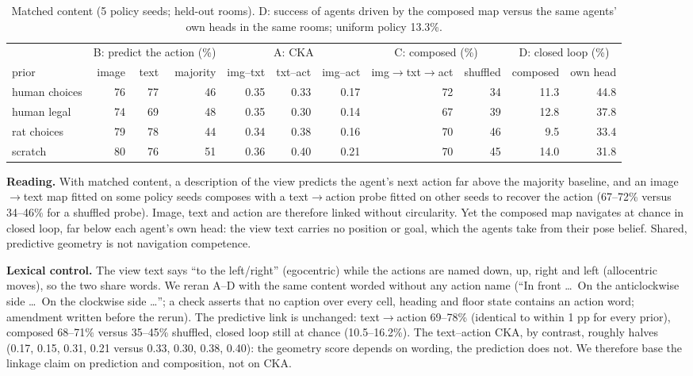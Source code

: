 \documentclass[10pt,onecolumn,letterpaper]{article}
\begin{document}
\begin{table}[h]\centering\footnotesize\setlength{\tabcolsep}{3pt}
\begin{tabular}{@{}lrrrrrrrrrr@{}}\toprule
 & \multicolumn{3}{c}{B: predict the action (\%)} & \multicolumn{3}{c}{A: CKA} & \multicolumn{2}{c}{C: composed (\%)} & \multicolumn{2}{c}{D: closed loop (\%)}\\
prior & image & text & majority & img--txt & txt--act & img--act & img$\to$txt$\to$act & shuffled & composed & own head\\\midrule
human choices & 76 & 77 & 46 & 0.35 & 0.33 & 0.17 & 72 & 34 & 11.3 & 44.8\\
human legal & 74 & 69 & 48 & 0.35 & 0.30 & 0.14 & 67 & 39 & 12.8 & 37.8\\
rat choices & 79 & 78 & 44 & 0.34 & 0.38 & 0.16 & 70 & 46 & 9.5 & 33.4\\
scratch & 80 & 76 & 51 & 0.36 & 0.40 & 0.21 & 70 & 45 & 14.0 & 31.8\\
\bottomrule\end{tabular}
\caption{Matched content (5 policy seeds; held-out rooms). D: success of agents driven by the composed map versus the
same agents' own heads in the same rooms; uniform policy 13.3\%.}\end{table}

\textbf{Reading.} With matched content, a description of the view predicts the agent's next action far above the
majority baseline, and an image$\to$text map fitted on some policy seeds composes with a text$\to$action probe fitted on
other seeds to recover the action (67--72\% versus 34--46\% for a shuffled probe). Image, text and action are therefore
linked without circularity. Yet the composed map navigates at chance in closed loop, far below each agent's own head:
the view text carries no position or goal, which the agents take from their pose belief. Shared, predictive geometry is
not navigation competence.

\textbf{Lexical control.} The view text says ``to the left/right'' (egocentric) while the actions are named down, up,
right and left (allocentric moves), so the two share words. We reran A--D with the same content worded without any
action name (``In front \dots\ On the anticlockwise side \dots\ On the clockwise side \dots''; a check asserts that no
caption over every cell, heading and floor state contains an action word; amendment written before the rerun). The
predictive link is unchanged: text$\to$action 69--78\% (identical to within 1 pp for every prior), composed 68--71\%
versus 35--45\% shuffled, closed loop still at chance (10.5--16.2\%). The text--action CKA, by contrast, roughly halves
(0.17, 0.15, 0.31, 0.21 versus 0.33, 0.30, 0.38, 0.40): the geometry score depends on wording, the prediction does not.
We therefore base the linkage claim on prediction and composition, not on CKA.
\end{document}
